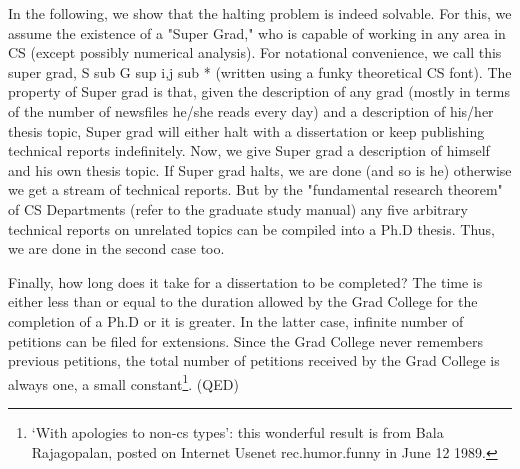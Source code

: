 In the following, we show that the halting problem is indeed solvable. For this, we assume the existence of a "Super Grad," who is capable of working in any area in CS (except possibly numerical analysis). For notational convenience, we call this super grad, S sub G sup i,j sub * (written using a funky theoretical CS font). The property of Super grad is that, given the description of any grad (mostly in terms of the number of newsfiles he/she reads every day) and a description of his/her thesis topic, Super grad will either halt with a dissertation or keep publishing technical reports indefinitely. Now, we give Super grad a description of himself and his own thesis topic. If Super grad halts, we are done (and so is he) otherwise we get a stream of technical reports. But by the "fundamental research theorem" of CS Departments (refer to the graduate study manual) any five arbitrary technical reports on unrelated topics can be compiled into a Ph.D thesis. Thus, we are done in the second case too.

Finally, how long does it take for a dissertation to be completed? The time is either less than or equal to the duration allowed by the Grad College for the completion of a Ph.D or it is greater. In the latter case, infinite number of petitions can be filed for extensions. Since the Grad College never remembers previous petitions, the total number of petitions received by the Grad College is always one, a small constant\footnote{`With apologies to non-cs types': this wonderful result is from Bala Rajagopalan, posted on Internet Usenet rec.humor.funny in June 12 1989.}. (QED)
